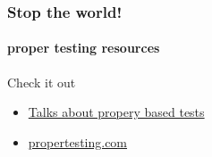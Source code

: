 \documentclass{beamer}
\begin{document}
  \begin{frame}
    \frametitle{Stop the world!}
    \framesubtitle{proper testing resources}
      
    \begin{alertblock}{Check it out}
    \begin{itemize}
      \item \href{https://www.youtube.com/user/ErlangSolutions/search?query=property}{Talks about propery based tests}
      \item \href{https://propertesting.com}{propertesting.com}
    \end{itemize}
    \end{alertblock}

  \end{frame}

  
\end{document}
